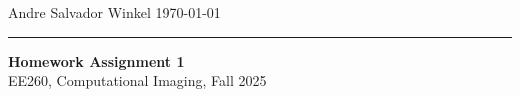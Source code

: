 \documentclass[11pt]{article}
\begin{document}
\noindent Andre Salvador Winkel \hfill \today \\
\rule{\textwidth}{0.4pt}

\begin{center} \large {\textbf{Homework Assignment 1}} \\[0em] {EE260, Computational Imaging, Fall 2025} \end{center}



\end{document}
